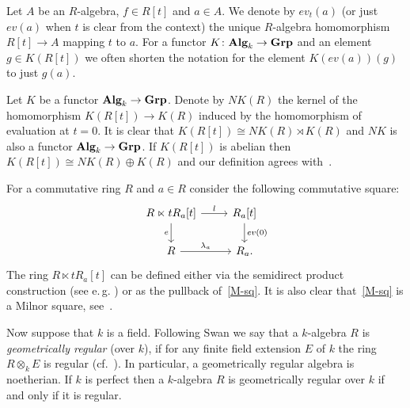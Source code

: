 \documentclass[oneside, 11pt]{amsart} \pdfoutput=1
\begin{document}
Let $A$ be an $R$-algebra, $f\in R[t]$ and $a \in A$. We denote by $ev_t(a)$ (or just $ev(a)$ when $t$ is clear from the context) the unique $R$-algebra homomorphism $R[t] \to A$ mapping $t$ to $a$. For a functor $K \colon {\normalfont\textbf{Alg}}_k \to {\normalfont\textbf{Grp}}$ and an element $g \in K(R[t])$ we often shorten the notation for the element $K(ev(a))(g)$ to just $g(a)$.

\begin{df}\label{df:NK}
Let $K$ be a functor ${\normalfont\textbf{Alg}}_k \to {\normalfont\textbf{Grp}}$.
Denote by $NK(R)$ the kernel of the homomorphism $K(R[t]) \to K(R)$ induced by the homomorphism of evaluation at $t=0$. It is clear that $K(R[t]) \cong NK(R) \rtimes K(R)$ and $NK$ is also a functor ${\normalfont\textbf{Alg}}_k \to {\normalfont\textbf{Grp}}$. If $K(R[t])$ is abelian then $K(R[t]) \cong NK(R) \oplus K(R)$ and our definition agrees with~\cite[Def.~III.3.3]{Kbook}.
\end{df}

For a commutative ring $R$ and $a \in R$ consider the following commutative square:
  \begin{equation} \label{M-sq} \begin{tikzcd} R \ltimes t R_a[t] \ar{r}{l} \ar{d}[swap]{e} & R_a[t] \ar{d}{ev(0)} \\ R \ar{r}{\lambda_a} & R_a. \end{tikzcd}\end{equation}
  The ring $R \ltimes tR_a[t]$ can be defined either via the semidirect product construction (see e.\,g. \cite[Definition~3.2]{S15}) or as the pullback of~\eqref{M-sq}.
  It is also clear that~\eqref{M-sq} is a Milnor square, see~\cite[Example~I.2.6]{Kbook}.

Now suppose that $k$ is a field. Following Swan we say that a $k$-algebra $R$ is {\it geometrically regular} (over $k$), if for any finite field extension $E$ of $k$ the ring $R\otimes_kE$ is regular (cf.~\cite[p.~137]{Sw98}). In particular, a geometrically regular algebra is noetherian. If $k$ is perfect then a $k$-algebra $R$ is geometrically regular over $k$ if and only if it is regular.
\end{document}
